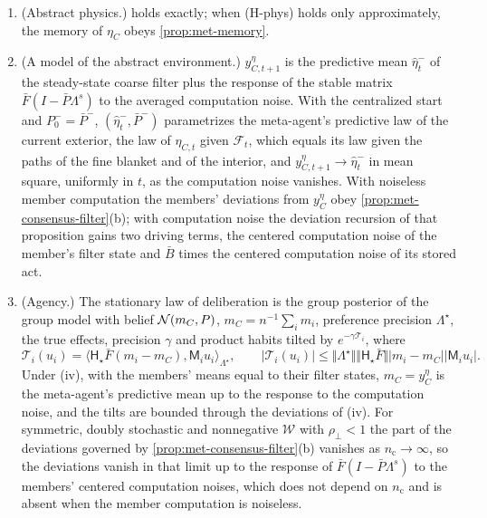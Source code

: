 \begin{theorem}
\begin{enumerate}
\item[(iii)] (Abstract physics.)  holds exactly; when (H-phys) holds only approximately, the memory of $\eta_C$ obeys \cref{prop:met-memory}.
\item[(iv)] (A model of the abstract environment.) $y^\eta_{C,t+1}$ is the predictive mean $\hat\eta^-_t$ of the steady-state coarse filter plus the response of the stable matrix $\bar F(I-\bar P\Lambda^s)$ to the averaged computation noise. With the centralized start and $P^-_0=\bar P^-$, $(\hat\eta^-_t,\bar P^-)$ parametrizes the meta-agent's predictive law of the current exterior, the law of $\eta_{C,t}$ given $\mathcal F_t$, which equals its law given the paths of the fine blanket and of the interior, and $y^\eta_{C,t+1}\to\hat\eta^-_t$ in mean square, uniformly in $t$, as the computation noise vanishes. With noiseless member computation the members' deviations from $y^\eta_C$ obey \cref{prop:met-consensus-filter}(b); with computation noise the deviation recursion of that proposition gains two driving terms, the centered computation noise of the member's filter state and $\bar B$ times the centered computation noise of its stored act.
\item[(v)] (Agency.) The stationary law of deliberation is the group posterior of the group model with belief $\mathcal{N}(m_C,P)$, $m_C=n^{-1}\sum_im_i$, preference precision $\Lambda^\star$, the true effects, precision $\gamma$ and product habits tilted by $e^{-\gamma\mathcal T_i}$, where
\begin{equation}\label{eq:met-tilt}
\mathcal T_i(u_i)=\bigl\langle\mathsf H_\star\bar F(m_i-m_C),\mathsf M_iu_i\bigr\rangle_{\Lambda^\star},\qquad\lvert\mathcal T_i(u_i)\rvert\le\Vert\Lambda^\star\Vert\Vert\mathsf H_\star\bar F\Vert\lvert m_i-m_C\rvert\lvert\mathsf M_iu_i\rvert.
\end{equation}
Under (iv), with the members' means equal to their filter states, $m_C=y^\eta_C$ is the meta-agent's predictive mean up to the response to the computation noise, and the tilts are bounded through the deviations of (iv). For symmetric, doubly stochastic and nonnegative $\mathcal W$ with $\rho_\perp<1$ the part of the deviations governed by \cref{prop:met-consensus-filter}(b) vanishes as $n_{\mathrm c}\to\infty$, so the deviations vanish in that limit up to the response of $\bar F(I-\bar P\Lambda^s)$ to the members' centered computation noises, which does not depend on $n_{\mathrm c}$ and is absent when the member computation is noiseless.
\end{enumerate}
\end{theorem}
